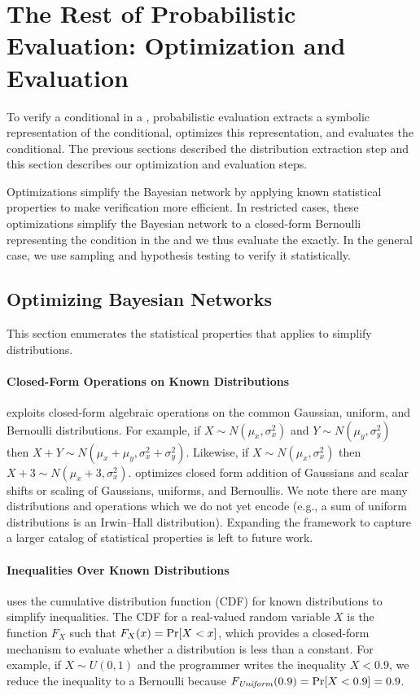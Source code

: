 \section{The Rest of Probabilistic Evaluation: Optimization and
  Evaluation}
\label{passert:sec:mechanisms}

To verify a conditional in a \passert, probabilistic evaluation
extracts a symbolic representation of the conditional, optimizes this
representation, and evaluates the conditional.  The previous sections
described the distribution extraction step and this section describes our
optimization and evaluation steps. 

Optimizations simplify the Bayesian network by applying known
statistical properties to make verification more efficient. In
restricted cases, these optimizations simplify the Bayesian network to a
closed-form Bernoulli representing the condition in the \passert and we thus
evaluate the \passert exactly. In the general case, we use sampling
and hypothesis testing to verify it statistically.

\subsection{Optimizing Bayesian Networks}
\label{passert:sec:optim}

This section enumerates the statistical
properties that \tool applies to simplify distributions.

\paragraph{Closed-Form Operations on Known Distributions}
\tool exploits closed-form algebraic operations on the common
Gaussian, uniform, and Bernoulli distributions.
For example, if $X \sim N(\mu_x, \sigma^2_x)$ and $Y \sim N(\mu_y,
\sigma^2_y)$ then $X + Y \sim N(\mu_x + \mu_y, \sigma^2_x +
\sigma^2_y)$.  Likewise, if $X \sim N(\mu_x, \sigma^2_x)$ then $X + 3
\sim N(\mu_x + 3, \sigma^2_x)$.  \tool optimizes closed form addition
of Gaussians and scalar shifts or scaling of Gaussians, uniforms, and
Bernoullis.  We note there are many distributions and operations which
we do not yet encode (e.g., a sum of uniform distributions is
an Irwin--Hall distribution).
Expanding the framework to capture a larger catalog of statistical properties is left
to future work.

\paragraph{Inequalities Over Known Distributions} \tool uses the
cumulative distribution function (CDF) for known distributions to
simplify inequalities.  The CDF for a real-valued random variable $X$ is
the function $F_X$ such that $F_X(x) = \Pr\!\left[X < x\right]$, which provides a
closed-form mechanism to evaluate whether a distribution is less than
a constant.  For example, if $X \sim U(0,1)$ and the programmer writes
the inequality $X < 0.9$, we reduce the inequality
to a Bernoulli because $F_{\mathit{Uniform}}(0.9) = \Pr\!\left[X < 0.9\right] = 0.9$.  

